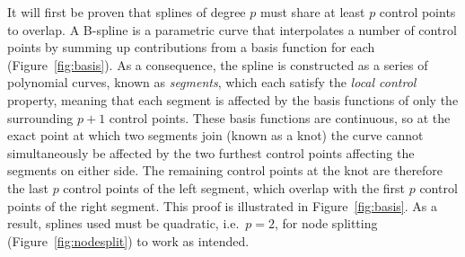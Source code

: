 It will first be proven that splines of degree $p$ must share at least $p$ control points to overlap. A B-spline is a parametric curve that interpolates a number of control points by summing up contributions from a basis function for each (Figure~\ref{fig:basis}). As a consequence, the spline is constructed as a series of polynomial
curves, known as \emph{segments}, which each satisfy
the \emph{local control} property, meaning that each segment is affected by the basis functions of only the surrounding $p+1$ control points. These basis functions are continuous, so at the exact point at which two segments join (known as a knot) the curve cannot simultaneously be affected by the two furthest control points affecting the segments on either side. The remaining control points at the knot are therefore the last $p$ control points of the left segment, which overlap with the first $p$ control points of the right segment.
This proof is illustrated in Figure~\ref{fig:basis}. As a result, splines used must be quadratic, i.e.\ $p=2$, for node splitting (Figure~\ref{fig:nodesplit}) to work as intended.

